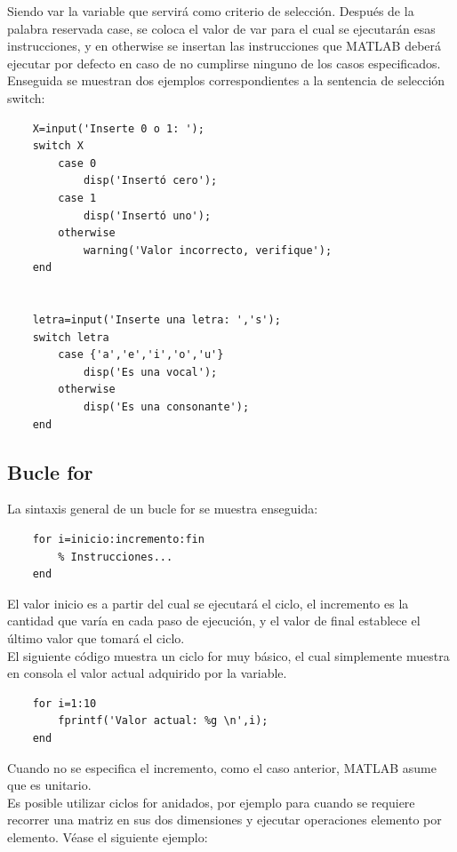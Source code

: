 Siendo var la variable que servirá como criterio de selección. Después de la palabra 
reservada case, se coloca el valor de var para el cual se ejecutarán esas instrucciones, 
y en otherwise se insertan las instrucciones que MATLAB deberá ejecutar por defecto en 
caso de no cumplirse ninguno de los casos especificados.\\

Enseguida se muestran dos ejemplos correspondientes a la sentencia de selección switch:

\begin{verbatim}
	X=input('Inserte 0 o 1: ');
	switch X
	    case 0
	        disp('Insertó cero');
	    case 1
	        disp('Insertó uno');
	    otherwise
	        warning('Valor incorrecto, verifique');     
	end


	letra=input('Inserte una letra: ','s');
	switch letra
	    case {'a','e','i','o','u'}
	        disp('Es una vocal');
	    otherwise
	        disp('Es una consonante');
	end
\end{verbatim}


\subsection{Bucle for}

La sintaxis general de un bucle for se muestra enseguida:

\begin{verbatim}
	for i=inicio:incremento:fin
	    % Instrucciones...
	end
\end{verbatim}

El valor inicio es a partir del cual se ejecutará el ciclo, el incremento es la 
cantidad que varía en cada paso de ejecución, y el valor de final establece el 
último valor que  tomará el ciclo.\\

El siguiente código muestra un ciclo for muy básico, el cual simplemente muestra 
en consola el valor actual adquirido por la variable.

\begin{verbatim}
	for i=1:10
	    fprintf('Valor actual: %g \n',i);
	end
\end{verbatim}

Cuando no se especifica el incremento, como el caso anterior, MATLAB asume que es unitario.\\

Es posible utilizar ciclos for anidados, por ejemplo para cuando se requiere 
recorrer una matriz en sus dos dimensiones y ejecutar operaciones elemento 
por elemento. Véase el siguiente ejemplo:

